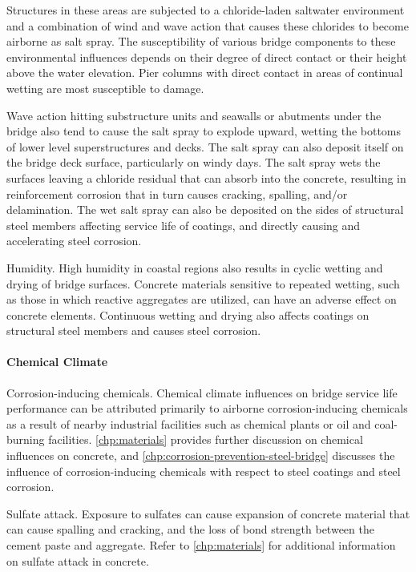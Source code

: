 Structures in these areas are subjected to a chloride-laden saltwater environment and a combination of wind and
wave action that causes these chlorides to become airborne as salt spray. The susceptibility of various bridge
components to these environmental influences depends on their degree of direct contact or their height above the
water elevation. Pier columns with direct contact in areas of continual wetting are most susceptible to damage.

Wave action hitting substructure units and seawalls or abutments under the bridge also tend to cause the salt
spray to explode upward, wetting the bottoms of lower level superstructures and decks. The salt spray can also
deposit itself on the bridge deck surface, particularly on windy days. The salt spray wets the surfaces leaving a
chloride residual that can absorb into the concrete, resulting in reinforcement corrosion that in turn causes cracking, spalling, and/or delamination. The wet salt spray can also be deposited on the sides of structural steel members
affecting service life of coatings, and directly causing and accelerating steel corrosion.

Humidity. High humidity in coastal regions also results in cyclic wetting and drying of bridge surfaces. Concrete
materials sensitive to repeated wetting, such as those in which reactive aggregates are utilized, can have an adverse
effect on concrete elements. Continuous wetting and drying also affects coatings on structural steel members and
causes steel corrosion.

\paragraph{Chemical Climate}

Corrosion-inducing chemicals. Chemical climate influences on bridge service life performance can be
attributed primarily to airborne corrosion-inducing chemicals as a result of nearby industrial facilities such as
chemical plants or oil and coal-burning facilities. \cref{chp:materials} provides further discussion on chemical influences on
concrete, and \cref{chp:corrosion-prevention-steel-bridge} discusses the influence of corrosion-inducing chemicals with respect to steel coatings and
steel corrosion.

Sulfate attack. Exposure to sulfates can cause expansion of concrete material that can cause spalling and
cracking, and the loss of bond strength between the cement paste and aggregate. Refer to \cref{chp:materials} for additional
information on sulfate attack in concrete.


